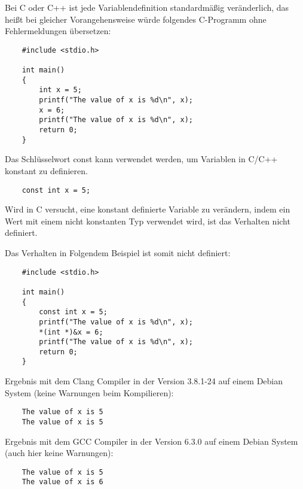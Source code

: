Bei C oder C++ ist jede Variablendefinition standardmäßig veränderlich, das heißt bei gleicher Vorangehensweise würde folgendes C-Programm ohne Fehlermeldungen übersetzen:

\begin{lstlisting}
    #include <stdio.h>

    int main()
    {
        int x = 5;
        printf("The value of x is %d\n", x);
        x = 6;
        printf("The value of x is %d\n", x);
        return 0;
    }    
\end{lstlisting}

Das Schlüsselwort \glqq const\grqq{} kann verwendet werden, um Variablen in C/C++ konstant zu definieren.

\begin{lstlisting}
    const int x = 5;
\end{lstlisting}

Wird in C versucht, eine konstant definierte Variable zu verändern, indem ein Wert mit einem nicht konstanten Typ verwendet wird, ist das Verhalten nicht definiert. \cite[p.~87]{ISO:9899:2017}

Das Verhalten in Folgendem Beispiel ist somit nicht definiert:

\begin{lstlisting}
    #include <stdio.h>

    int main()
    {
        const int x = 5;
        printf("The value of x is %d\n", x);
        *(int *)&x = 6;
        printf("The value of x is %d\n", x);
        return 0;
    }
\end{lstlisting}

Ergebnis mit dem Clang Compiler in der Version 3.8.1-24 auf einem Debian System (keine Warnungen beim Kompilieren):

\begin{lstlisting}
    The value of x is 5
    The value of x is 5
\end{lstlisting}

Ergebnis mit dem GCC Compiler in der Version 6.3.0 auf einem Debian System (auch hier keine Warnungen):

\begin{lstlisting}
    The value of x is 5
    The value of x is 6
\end{lstlisting}
